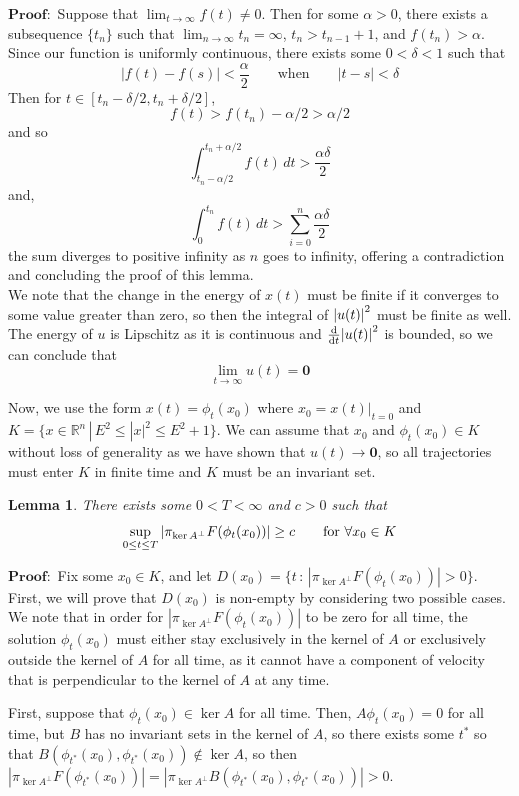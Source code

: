 \documentclass[11pt]{article}
\newtheorem{lemma}{Lemma}
\newcommand{\R}{\mathbb{R}}
\begin{document}
$\mathbf{Proof:}$ Suppose that $\lim _{t \rightarrow \infty}f(t) \neq 0$. Then for some $\alpha > 0$, there exists a subsequence $\{ t_n \}$ such that $\lim_{n \rightarrow \infty}t_n = \infty$, $t_n > t_{n -1} + 1$, and $f(t_n) > \alpha$. Since our function is uniformly continuous, there exists some $0 < \delta < 1$ such that $$|f(t) - f(s)| < \frac{\alpha}{2} \qquad \text{when} \qquad |t - s| < \delta$$ Then for $t \in [t_n - \delta / 2, t_n + \delta / 2]$, $$f(t) > f(t_n) - \alpha/ 2 > \alpha / 2$$ and so $$\int_{t_n - \alpha / 2}^{t_n + \alpha / 2}f(t)\, dt > \frac{\alpha \delta}{2}$$ and, $$\int_0 ^{t_n}f(t)\, dt > \sum _{i = 0}^{n}\frac{\alpha \delta}{2}$$ the sum diverges to positive infinity as $n$ goes to infinity, offering a contradiction and concluding the proof of this lemma.\\ 

We note that the change in the energy of $x(t)$ must be finite if it converges to some value greater than zero, so then the integral of $\abs{u(t)}^2$ must be finite as well. The energy of $u$ is Lipschitz as it is continuous and $\dv{}{t}\abs{u(t)}^2$ is bounded, so we can conclude that $$\lim _{t \rightarrow \infty}u(t) = \mathbf{0}$$

Now, we use the form $x(t) = \phi_t(x_0)$ where $x_0 = x(t)|_{t = 0}$ and $K = \{x \in \R^n \, | \, E^2 \leq |x|^2 \leq E^2 + 1 \}$. We can assume that $x_0$ and $\phi_t(x_0) \in K$ without loss of generality as we have shown that $u(t) \rightarrow \mathbf{0}$, so all trajectories must enter $K$ in finite time and $K$ must be an invariant set. 

\begin{lemma}
    There exists some $0 < T < \infty$ and $c > 0$ such that $$\sup _{0 \leq t \leq T}\abs{\pi_{\ker A^{\perp}}F(\phi_t(x_0))} \geq c \qquad \text{for } \forall x_0 \in K$$
\end{lemma}

$\mathbf{Proof: }$ Fix some $x_0 \in K$, and let $D(x_0) = \{t \, : \, |\pi_{\ker A^{\perp}}F(\phi_t(x_0))| > 0 \}$. First, we will prove that $D(x_0)$ is non-empty by considering two possible cases. We note that in order for $|\pi_{\ker A^{\perp}}F(\phi_t(x_0))|$ to be zero for all time, the solution $\phi_t(x_0)$ must either stay exclusively in the kernel of $A$ or exclusively outside the kernel of $A$ for all time, as it cannot have a component of velocity that is perpendicular to the kernel of $A$ at any time.

First, suppose that $\phi_t(x_0) \in \ker A$ for all time. Then, $A \phi_t(x_0) = 0$ for all time, but $B$ has no invariant sets in the kernel of $A$, so there exists some $t^*$ so that $B(\phi_{t^*}(x_0), \phi_{t^*}(x_0)) \notin \ker A$, so then $|\pi_{\ker A^{\perp}}F(\phi_{t^*}(x_0))| = |\pi_{\ker A^{\perp}}B(\phi_{t^*}(x_0), \phi_{t^*}(x_0))| > 0$.
\end{document}
